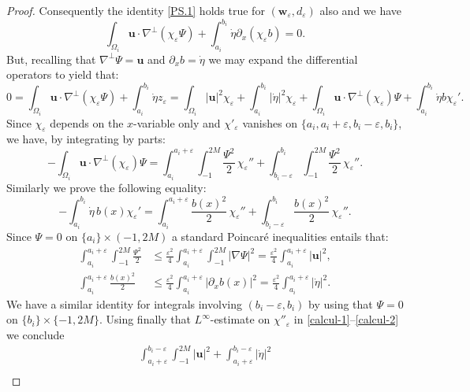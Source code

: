 \documentclass[10pt]{amsart}
\theoremstyle{remark}
\theoremstyle{definition}
\newcommand{\ug}{\boldsymbol{u}}
\newcommand{\wg}{\boldsymbol{w}}
\let\CM\Omega
\newcommand{\etap}{\dot{\eta}}
\begin{document}
\begin{proof}
Consequently the identity \eqref{PS.1} holds true for $(\wg_{\varepsilon},d_{\varepsilon})$ also and we have
\[
\int_{\CM_{i}}\ug\cdot\nabla^{\perp}(\chi_{\varepsilon}\Psi) + \int_{a_{i}}^{b_{i}}\etap \partial_x (\chi_{\varepsilon} b)=0.
\]
But, recalling that $\nabla^{\bot} \Psi = \ug$ and $\partial_x b = \dot{\eta}$ we may expand the differential operators to yield that:
\[
0 = \int_{\CM_{i}}\ug\cdot\nabla^{\perp}(\chi_{\varepsilon}\Psi) + \int_{a_{i}}^{b_{i}}\etap z_\varepsilon=\int_{\CM_{i}}\vert\ug\vert^{2}\chi_\varepsilon + \int_{a_{i}}^{b_{i}}\vert\etap\vert^{2}\chi_\varepsilon + \int_{\CM_{i}}\ug\cdot\nabla^{\perp}(\chi_{\varepsilon})\Psi + \int_{a_{i}}^{b_{i}}\etap b{\chi}_{\varepsilon}'.
\]
Since $\chi_{\varepsilon}$ depends on the $x$-variable only and $\chi'_{\varepsilon}$ vanishes on $\{a_i,a_i+ \varepsilon,b_i-\varepsilon,b_i\}$, we have, by integrating by parts:
\begin{equation}\label{calcul-1}
-\int_{\CM_{i}}\ug\cdot\nabla^{\perp}(\chi_{\varepsilon})\Psi=\int_{a_i}^{a_i+\varepsilon} \int_{-1}^{2M} \frac{\Psi^{2}}{2}\,{\chi}_{\varepsilon}''
+ \int_{b_i-\varepsilon}^{b_i} \int_{-1}^{2M} \frac{\Psi^{2}}{2}\,{\chi}_{\varepsilon}''.
\end{equation}
Similarly we prove the following equality:
\begin{equation}\label{calcul-2}-\int_{a_{i}}^{b_{i}}\etap\,b(x) {\chi}_{\varepsilon}'=
\int_{a_i}^{a_i+\varepsilon}\frac{b(x)^{2}}{2}\,{{\chi}_{\varepsilon}''}
+\int_{b_i-\varepsilon}^{b_i}\frac{b(x)^{2}}{2}\,{{\chi}_{\varepsilon}''}.
\end{equation}
Since $\Psi=0$ on $\{a_{i}\}\times(-1,2M)$
a standard Poincaré inequalities entails that:
\[\begin{aligned}
\int_{a_{i}}^{a_i+\varepsilon} \int_{-1}^{2M} \frac{\Psi^{2}}{2}&\leq \frac{\varepsilon^{2}}{4}\int_{a_{i}}^{a_i+\varepsilon} \int_{-1}^{2M}\vert\nabla\Psi\vert^{2}=\frac{\varepsilon^{2}}{4}\int_{a_{i}}^{a_i+\varepsilon}\vert\ug\vert^{2},\\
\int_{a_{i}}^{a_i+\varepsilon}\frac{b(x)^{2}}{2}&\leq\frac{\varepsilon^{2}}{4}\int_{a_{i}}^{a_i+\varepsilon}\left|\partial_{x}b(x)\right|^{2}=\frac{\varepsilon^{2}}{4}\int_{a_{i}}^{a_i+\varepsilon}\vert\etap\vert^{2}.
\end{aligned}
\]
We have a similar identity for integrals involving $(b_i-\varepsilon,b_i)$ by using that $\Psi = 0$ on $\{b_i\} \times \{-1,2M\}$. Using finally that $L^{\infty}$-estimate on ${\chi}''_{\varepsilon}$ in \eqref{calcul-1}--\eqref{calcul-2} we conclude
\begin{multline}\label{calcul-3}\int_{a_i+\varepsilon}^{b_i-\varepsilon} \int_{-1}^{2M} \vert\ug\vert^{2}+\int_{a_{i}+\varepsilon}^{b_{i}-\varepsilon}\vert\etap\vert^{2} \\

\end{multline}
\end{proof}
\end{document}
